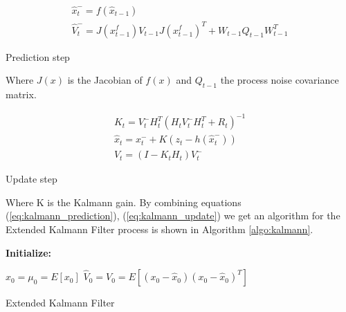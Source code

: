 \documentclass[mscthesis]{usiinfthesis}
\begin{document}
\begin{eqfloat}
\begin{equation}
\begin{array}{l}
\hat{x}_t^- = f(\hat{x}_{t-1}) \\
\hat{V}_t^- = J(x^f_{t-1}) V_{t-1} J(x^f_{t-1})^T + W_{t-1} Q_{t-1} W_{t-1}^T
\end{array}
\label{eq:kalman_predict}
\end{equation}
\caption{Prediction step}
\label{eq:kalmann_prediction}
\end{eqfloat}

Where $J(x)$ is the Jacobian of $f(x)$ and $Q_{t-1}$ the process noise covariance matrix.


\begin{eqfloat}
\begin{equation}
\begin{array}{l}
K_t = V_t^- H^T_t (H_t V_t^- H^T_t + R_t)^{-1} \\
\hat{x}_t = x_t^- + K (z_t - h(\hat{x}_t^-)) \\
V_t = (I-K_t H_t)V_t^-
\end{array}
\label{eq:kalman_update}
\end{equation}
\caption{Update step}
\label{eq:kalmann_update}
\end{eqfloat}

Where K is the Kalmann gain. By combining equations (\ref{eq:kalmann_prediction}), (\ref{eq:kalmann_update}) we get an algorithm for the Extended Kalmann Filter process is shown in Algorithm \ref{algo:kalmann}. 

\begin{algorithm}
\textbf{Initialize: }
\begin{substeps}
$\hat{x}_0 = \mu_0 = E[x_0]$ \;
$\hat{V}_0 = V_0 = E[(x_0-\hat{x}_0)(x_0-\hat{x}_0)^T]$  \;
\end{substeps}
  \caption{Extended Kalmann Filter}
  \label{algo:kalmann}
\end{algorithm}
\end{document}
